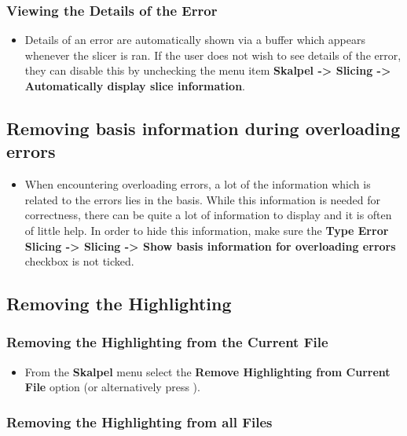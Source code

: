 \documentclass{report}
\begin{document}
\subsubsection{Viewing the Details of the Error}

\begin{itemize}
\item Details of an error are automatically shown via a buffer which
  appears whenever the slicer is ran. If the user does not wish to see
  details of the error, they can disable this by unchecking the menu
  item \textbf{Skalpel -> Slicing -> Automatically display
    slice information}.
\end{itemize}

\subsection{Removing basis information during overloading errors}
\begin{itemize}
\item When encountering overloading errors, a lot of the information
  which is related to the errors lies in the basis. While this
  information is needed for correctness, there can be quite a lot of
  information to display and it is often of little help. In order to
  hide this information, make sure the \textbf{Type Error Slicing ->
    Slicing -> Show basis information for overloading errors} checkbox
  is not ticked.
\end{itemize}


\subsection{Removing the Highlighting}

\subsubsection{Removing the Highlighting from the Current File}

\begin{itemize}
\item From the \textbf{Skalpel} menu select the \textbf{Remove
  Highlighting from Current File} option (or alternatively press
  ).
\end{itemize}

\subsubsection{Removing the Highlighting from all Files}
\end{document}
